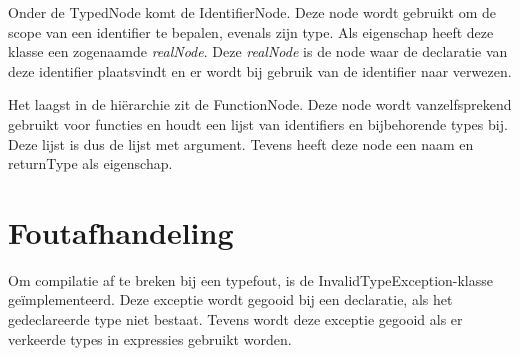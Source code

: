 Onder de TypedNode komt de IdentifierNode. Deze node wordt gebruikt om de scope van een identifier te bepalen, evenals zijn type. Als eigenschap heeft deze klasse een zogenaamde \emph{realNode}. Deze \emph{realNode} is de node waar de declaratie van deze identifier plaatsvindt en er wordt bij gebruik van de identifier naar verwezen.

Het laagst in de hi\"erarchie zit de FunctionNode. Deze node wordt vanzelfsprekend gebruikt voor functies en houdt een lijst van identifiers en bijbehorende types bij. Deze lijst is dus de lijst met argument. Tevens heeft deze node een naam en returnType als eigenschap.

\section{Foutafhandeling} %
\label{sec:foutafhandeling}
Om compilatie af te breken bij een typefout, is de InvalidTypeException-klasse ge\"implementeerd. Deze exceptie wordt gegooid bij een declaratie, als het gedeclareerde type niet bestaat. Tevens wordt deze exceptie gegooid als er verkeerde types in expressies gebruikt worden.

\clearpage